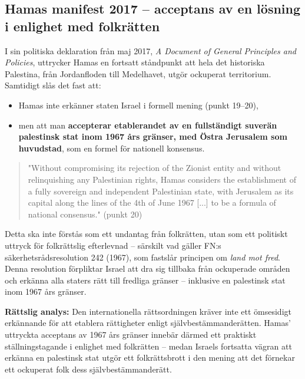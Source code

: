 
\subsection{Hamas manifest 2017 – acceptans av en lösning i enlighet med folkrätten}

I sin politiska deklaration från maj 2017, \textit{A Document of General Principles and Policies}, uttrycker Hamas en fortsatt ståndpunkt att hela det historiska Palestina, från Jordanfloden till Medelhavet, utgör ockuperat territorium. Samtidigt slås det fast att:

\begin{itemize}
  \item Hamas inte erkänner staten Israel i formell mening (punkt 19–20),
  \item men att man \textbf{accepterar etablerandet av en fullständigt suverän palestinsk stat inom 1967 års gränser, med Östra Jerusalem som huvudstad}, som en formel för nationell konsensus.
\end{itemize}

\begin{quote}
"Without compromising its rejection of the Zionist entity and without relinquishing any Palestinian rights, Hamas considers the establishment of a fully sovereign and independent Palestinian state, with Jerusalem as its capital along the lines of the 4th of June 1967 [...] to be a formula of national consensus." (punkt 20)
\end{quote}

Detta ska inte förstås som ett undantag från folkrätten, utan som ett politiskt uttryck för folkrättslig efterlevnad – särskilt vad gäller FN:s säkerhetsrådsresolution 242 (1967), som fastslår principen om \textit{land mot fred}. Denna resolution förpliktar Israel att dra sig tillbaka från ockuperade områden och erkänna alla staters rätt till fredliga gränser – inklusive en palestinsk stat inom 1967 års gränser.

\vspace{0.5em}
\noindent
\textbf{Rättslig analys:}  
Den internationella rättsordningen kräver inte ett ömsesidigt erkännande för att etablera rättigheter enligt självbestämmanderätten. Hamas’ uttryckta acceptans av 1967 års gränser innebär därmed ett praktiskt ställningstagande i enlighet med folkrätten – medan Israels fortsatta vägran att erkänna en palestinsk stat utgör ett folkrättsbrott i den mening att det förnekar ett ockuperat folk dess självbestämmanderätt.





